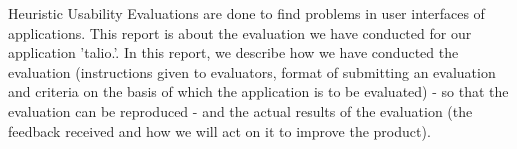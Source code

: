 Heuristic Usability Evaluations are done to find problems in user interfaces of applications. This report is about the evaluation we have conducted for our application 'talio.'.  In this report, we describe how we have conducted the evaluation (instructions given to evaluators, format of submitting an evaluation and criteria on the basis of which the application is to be evaluated) - so that the evaluation can be reproduced - and the actual results of the evaluation (the feedback received and how we will act on it to improve the product).